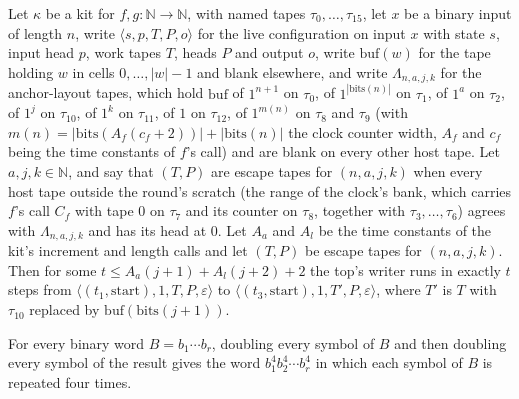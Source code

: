 \begin{theorem}
\label{Turing.NTimeDiag.qy_top_code}
\leanok
{}
Let $\kappa$ be a kit for $f, g : \mathbb{N} \to \mathbb{N}$, with named tapes $\tau_0, \dots,
\tau_{15}$, let $x$ be a binary input of length $n$, write $\langle s, p, T, P, o\rangle$ for the
live configuration on input $x$ with state $s$, input head $p$, work tapes $T$, heads $P$ and
output $o$, write $\mathrm{buf}(w)$ for the tape holding $w$ in cells $0, \dots, |w| - 1$ and blank
elsewhere, and write $\Lambda_{n,a,j,k}$ for the anchor-layout tapes, which hold $\mathrm{buf}$ of
$1^{n+1}$ on $\tau_0$, of $1^{|\mathrm{bits}(n)|}$ on $\tau_1$, of $1^a$ on $\tau_2$, of $1^j$ on
$\tau_{10}$, of $1^k$ on $\tau_{11}$, of $1$ on $\tau_{12}$, of $1^{m(n)}$ on $\tau_8$ and $\tau_9$
(with $m(n) = |\mathrm{bits}(A_f(c_f + 2))| + |\mathrm{bits}(n)|$ the clock counter width, $A_f$
and $c_f$ being the time constants of $f$'s call) and are blank on every other host tape. Let $a,
j, k \in \mathbb{N}$, and say that $(T, P)$ are escape tapes for $(n, a, j, k)$ when every host
tape outside the round's scratch (the range of the clock's bank, which carries $f$'s call $C_f$
with tape $0$ on $\tau_7$ and its counter on $\tau_8$, together with $\tau_3, \dots, \tau_6$)
agrees with $\Lambda_{n,a,j,k}$ and has its head at $0$. Let $A_a$ and $A_l$ be the time constants
of the kit's increment and length calls and let $(T, P)$ be escape tapes for $(n, a, j, k)$. Then
for some $t \le A_a(j + 1) + A_l(j + 2) + 2$ the top's writer runs in exactly $t$ steps from
$\langle (t_1, \mathrm{start}), 1, T, P, \varepsilon\rangle$ to $\langle (t_3, \mathrm{start}), 1,
T', P, \varepsilon\rangle$, where $T'$ is $T$ with $\tau_{10}$ replaced by
$\mathrm{buf}(\mathrm{bits}(j + 1))$.
\end{theorem}

\begin{theorem}
\label{Turing.NTimeDiag.qy_flatMap_dbl_dbl}
\leanok
{}
For every binary word $B = b_1 \cdots b_r$, doubling every symbol of $B$ and then doubling every
symbol of the result gives the word $b_1^4 b_2^4 \cdots b_r^4$ in which each symbol of $B$ is
repeated four times.
\end{theorem}

